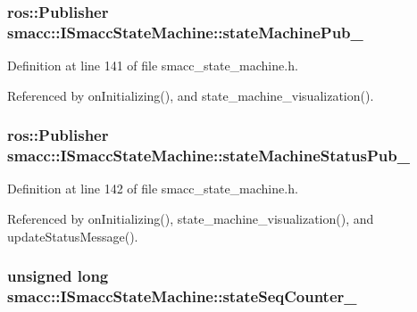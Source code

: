 \subsubsection[{\texorpdfstring{state\+Machine\+Pub\+\_\+}{stateMachinePub_}}]{\setlength{\rightskip}{0pt plus 5cm}ros\+::\+Publisher smacc\+::\+I\+Smacc\+State\+Machine\+::state\+Machine\+Pub\+\_\+\hspace{0.3cm}{\ttfamily [protected]}}\hypertarget{classsmacc_1_1ISmaccStateMachine_af4aa9fed70bd4c57b19e3370fbd25de7}{}\label{classsmacc_1_1ISmaccStateMachine_af4aa9fed70bd4c57b19e3370fbd25de7}


Definition at line 141 of file smacc\+\_\+state\+\_\+machine.\+h.



Referenced by on\+Initializing(), and state\+\_\+machine\+\_\+visualization().

\subsubsection[{\texorpdfstring{state\+Machine\+Status\+Pub\+\_\+}{stateMachineStatusPub_}}]{\setlength{\rightskip}{0pt plus 5cm}ros\+::\+Publisher smacc\+::\+I\+Smacc\+State\+Machine\+::state\+Machine\+Status\+Pub\+\_\+\hspace{0.3cm}{\ttfamily [protected]}}\hypertarget{classsmacc_1_1ISmaccStateMachine_a55a7c7b26ad4dfea441c62c6326a5414}{}\label{classsmacc_1_1ISmaccStateMachine_a55a7c7b26ad4dfea441c62c6326a5414}


Definition at line 142 of file smacc\+\_\+state\+\_\+machine.\+h.



Referenced by on\+Initializing(), state\+\_\+machine\+\_\+visualization(), and update\+Status\+Message().

\subsubsection[{\texorpdfstring{state\+Seq\+Counter\+\_\+}{stateSeqCounter_}}]{\setlength{\rightskip}{0pt plus 5cm}unsigned long smacc\+::\+I\+Smacc\+State\+Machine\+::state\+Seq\+Counter\+\_\+\hspace{0.3cm}{\ttfamily [private]}}\hypertarget{classsmacc_1_1ISmaccStateMachine_ab41ee07d20715142e2f7c92d551b2bd6}{}\label{classsmacc_1_1ISmaccStateMachine_ab41ee07d20715142e2f7c92d551b2bd6}


